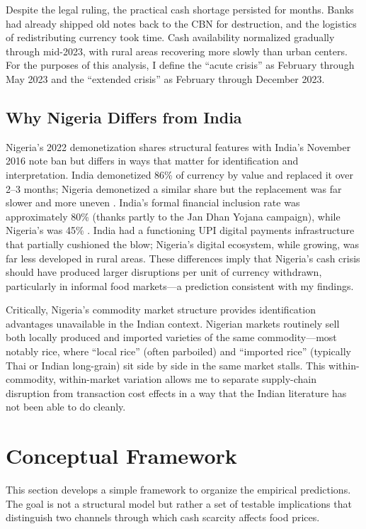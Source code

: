 \documentclass[12pt]{article}
\begin{document}
Despite the legal ruling, the practical cash shortage persisted for months. Banks had already shipped old notes back to the CBN for destruction, and the logistics of redistributing currency took time. Cash availability normalized gradually through mid-2023, with rural areas recovering more slowly than urban centers. For the purposes of this analysis, I define the ``acute crisis'' as February through May 2023 and the ``extended crisis'' as February through December 2023.

\subsection{Why Nigeria Differs from India}

Nigeria's 2022 demonetization shares structural features with India's November 2016 note ban but differs in ways that matter for identification and interpretation. India demonetized 86\% of currency by value and replaced it over 2--3 months; Nigeria demonetized a similar share but the replacement was far slower and more uneven \citep{chodorow-reich2020}. India's formal financial inclusion rate was approximately 80\% (thanks partly to the Jan Dhan Yojana campaign), while Nigeria's was 45\% \citep{world_bank2021findex, efina2022}. India had a functioning UPI digital payments infrastructure that partially cushioned the blow; Nigeria's digital ecosystem, while growing, was far less developed in rural areas. These differences imply that Nigeria's cash crisis should have produced larger disruptions per unit of currency withdrawn, particularly in informal food markets---a prediction consistent with my findings.

Critically, Nigeria's commodity market structure provides identification advantages unavailable in the Indian context. Nigerian markets routinely sell both locally produced and imported varieties of the same commodity---most notably rice, where ``local rice'' (often parboiled) and ``imported rice'' (typically Thai or Indian long-grain) sit side by side in the same market stalls. This within-commodity, within-market variation allows me to separate supply-chain disruption from transaction cost effects in a way that the Indian literature has not been able to do cleanly.


\section{Conceptual Framework}
\label{sec:framework}

This section develops a simple framework to organize the empirical predictions. The goal is not a structural model but rather a set of testable implications that distinguish two channels through which cash scarcity affects food prices.
\end{document}
